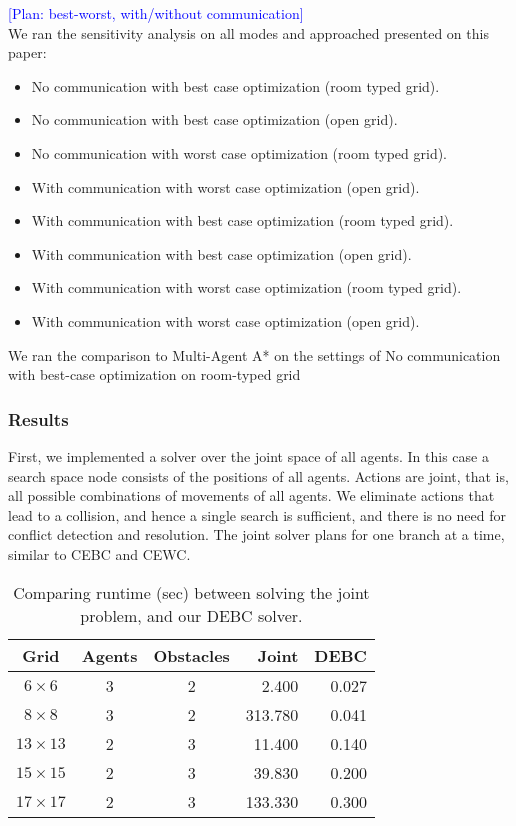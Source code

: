 \documentclass[letterpaper]{article} %
\newcommand{\plan}[1]{{\textcolor{blue}{[Plan: #1]}}}
\begin{document}
{\plan{best-worst, with/without communication}
\\We ran the sensitivity analysis on all modes and approached presented on this paper:
\begin{itemize}
  \item No communication with best case optimization (room typed grid). \item No communication with best case optimization (open grid).
  \item No communication with worst case optimization (room typed grid).
  \item With communication with worst case optimization (open grid).
  \item With communication with best case optimization (room typed grid).
  \item With communication with best case optimization (open grid).
  \item With communication with worst case optimization (room typed grid).
  \item With communication with worst case optimization (open grid).
\end{itemize}

We ran the comparison to Multi-Agent A* on the settings of No communication with best-case optimization on room-typed grid
}

\subsubsection{Results}

First, we implemented a solver over the joint space of all agents. In this case a search space node consists of the positions of all agents. Actions are joint, that is, all possible combinations of movements of all agents. We eliminate actions that lead to a collision, and hence a single search is sufficient, and there is no need for conflict detection and resolution. The joint solver plans for one branch at a time, similar to CEBC and CEWC.

\begin{table}[t]
\centering
\scriptsize
\begin{tabular}{| c | c | c | r | r |}
\hline
Grid & Agents & Obstacles & Joint & DEBC \\ \hline
$6 \times 6$ & 3   & 2 & 2.400 & 0.027 \\ \hline
$8 \times 8$ & 3   & 2 & 313.780 & 0.041 \\ \hline
$13 \times 13$ & 2   & 3 & 11.400 & 0.140 \\ \hline
$15 \times 15$ & 2   & 3 & 39.830 & 0.200 \\ \hline
$17 \times 17$ & 2   & 3 & 133.330 & 0.300 \\ \hline
\end{tabular}
\caption{Comparing runtime (sec) between solving the joint problem, and our DEBC solver.}
\label{tbl:joint}
\end{table}
\end{document}
